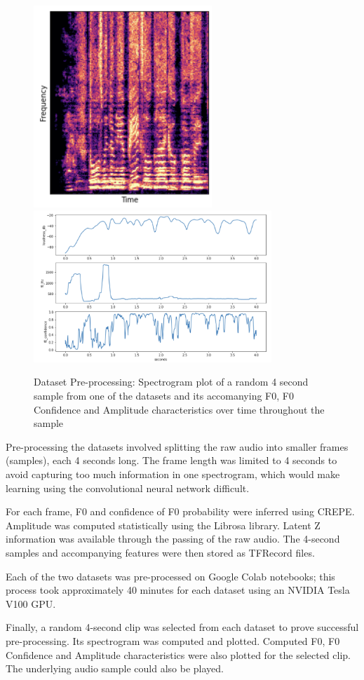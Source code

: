 \begin{figure}[!ht]
    \centering
    \includegraphics[width=0.6\textwidth]{research/dataset_preparation/PreprocessingSpecplot.png}
    \includegraphics[width=0.8\textwidth]{research/dataset_preparation/PreprocessingFeatures.png}
    \caption{Dataset Pre-processing: Spectrogram plot of a random 4 second sample from one of the datasets and its accomanying F0, F0 Confidence and Amplitude characteristics over time throughout the sample}
\end{figure}

Pre-processing the datasets involved splitting the raw audio into smaller frames (samples), each 4 seconds long. The frame length was limited to 4 seconds to avoid capturing too much information in one spectrogram, which would make learning using the convolutional neural network difficult.

For each frame, F0 and confidence of F0 probability were inferred using CREPE\cite{CREPE}. Amplitude was computed statistically using the Librosa library\cite{LibrosaPip}. Latent Z information was available through the passing of the raw audio. The 4-second samples and accompanying features were then stored as TFRecord files.

Each of the two datasets was pre-processed on Google Colab notebooks; this process took approximately 40 minutes for each dataset using an NVIDIA Tesla V100 GPU.

Finally, a random 4-second clip was selected from each dataset to prove successful pre-processing. Its spectrogram was computed and plotted. Computed F0, F0 Confidence and Amplitude characteristics were also plotted for the selected clip. The underlying audio sample could also be played.